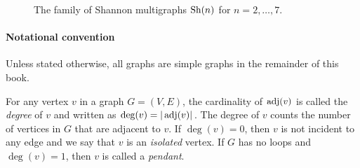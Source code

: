 \begin{figure}[!htbp]
{}
\quad
{}
\quad
{}
\caption{The family of Shannon multigraphs $\operatorname*{Sh}(n)$ for $n = 2,\dots,7$.}
\label{fig:introduction:Shannon_multigraphs}
\end{figure}

\paragraph{Notational convention}
Unless stated otherwise, all graphs are simple graphs in the remainder
of this book.

\begin{definition}
\rm
For any vertex $v$ in a graph $G = (V, E)$, the
cardinality of $\operatorname*{adj}(v)$ is called the
\emph{degree} of $v$ and written as
$\deg(v) = |\operatorname*{adj}(v)|$\index{$\deg$}. The degree of $v$ counts the
number of vertices in $G$ that are adjacent to $v$. If $\deg(v) = 0$,
then $v$ is not incident to any edge and we say that $v$ is an
\emph{isolated} vertex. If $G$ has no loops
and $\deg(v) = 1$, then $v$ is called a
\emph{pendant}.
\end{definition}

